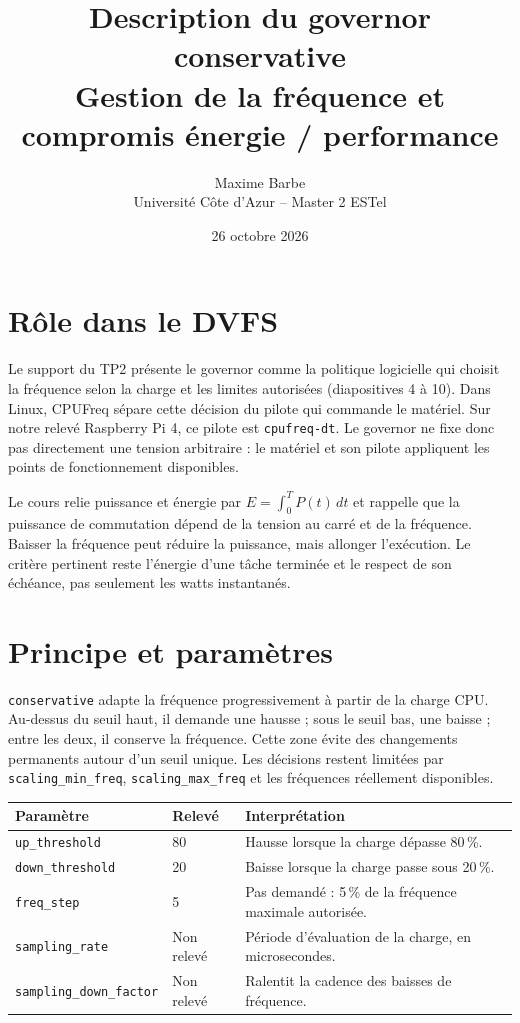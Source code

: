 \documentclass[11pt,a4paper]{article}
\title{\color{bleu}\textbf{Description du governor conservative}\\[5pt]\large Gestion de la fréquence et compromis énergie / performance}
\author{Maxime Barbe\\Université Côte d'Azur -- Master 2 ESTel}
\date{26 octobre 2026}
\begin{document}
\maketitle
\section{Rôle dans le DVFS}
Le support du TP2 présente le governor comme la politique logicielle qui choisit la fréquence selon la charge et les limites autorisées (diapositives 4 à 10). Dans Linux, CPUFreq sépare cette décision du pilote qui commande le matériel. Sur notre relevé Raspberry Pi 4, ce pilote est \texttt{cpufreq-dt}. Le governor ne fixe donc pas directement une tension arbitraire : le matériel et son pilote appliquent les points de fonctionnement disponibles.

Le cours relie puissance et énergie par $E=\int_0^T P(t)\,dt$ et rappelle que la puissance de commutation dépend de la tension au carré et de la fréquence. Baisser la fréquence peut réduire la puissance, mais allonger l'exécution. Le critère pertinent reste l'énergie d'une tâche terminée et le respect de son échéance, pas seulement les watts instantanés.

\section{Principe et paramètres}
\texttt{conservative} adapte la fréquence progressivement à partir de la charge CPU. Au-dessus du seuil haut, il demande une hausse ; sous le seuil bas, une baisse ; entre les deux, il conserve la fréquence. Cette zone évite des changements permanents autour d'un seuil unique. Les décisions restent limitées par \texttt{scaling\_min\_freq}, \texttt{scaling\_max\_freq} et les fréquences réellement disponibles.

\begin{center}
\begin{tabularx}{\linewidth}{@{}l l X@{}}
\toprule
Paramètre & Relevé & Interprétation\\
\midrule
\texttt{up\_threshold} & 80 & Hausse lorsque la charge dépasse 80\,\%.\\
\texttt{down\_threshold} & 20 & Baisse lorsque la charge passe sous 20\,\%.\\
\texttt{freq\_step} & 5 & Pas demandé : 5\,\% de la fréquence maximale autorisée.\\
\texttt{sampling\_rate} & Non relevé & Période d'évaluation de la charge, en microsecondes.\\
\texttt{sampling\_down\_factor} & Non relevé & Ralentit la cadence des baisses de fréquence.\\
\bottomrule
\end{tabularx}
\end{center}
\end{document}
